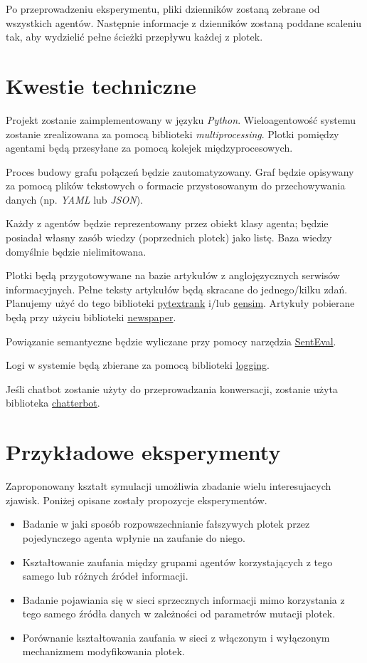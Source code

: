 \documentclass{article}
\begin{document}
	Po przeprowadzeniu eksperymentu, pliki dzienników zostaną zebrane od wszystkich agentów. Następnie informacje z dzienników zostaną poddane scaleniu tak, aby wydzielić pełne ścieżki przepływu każdej z plotek.
	\section{Kwestie techniczne}
	Projekt zostanie zaimplementowany w języku \textit{Python}. Wieloagentowość systemu zostanie zrealizowana za pomocą biblioteki \textit{multiprocessing}. Plotki pomiędzy agentami będą przesyłane za pomocą kolejek międzyprocesowych.
	
	Proces budowy grafu połączeń będzie zautomatyzowany. Graf będzie opisywany za pomocą plików tekstowych o formacie przystosowanym do przechowywania danych (np. \textit{YAML} lub \textit{JSON}).
	
	Każdy z agentów będzie reprezentowany przez obiekt klasy agenta; będzie posiadał własny zasób wiedzy (poprzednich plotek) jako listę. Baza wiedzy domyślnie będzie nielimitowana.
	
	Plotki będą przygotowywane na bazie artykułów z anglojęzycznych serwisów informacyjnych. Pełne teksty artykułów będą skracane do jednego/kilku zdań. Planujemy użyć do tego biblioteki \href{https://github.com/DerwenAI/pytextrank}{pytextrank} i/lub \href{https://pypi.org/project/gensim/}{gensim}. Artykuły pobierane będą przy użyciu biblioteki \href{https://newspaper.readthedocs.io/}{newspaper}.
	
	Powiązanie semantyczne będzie wyliczane przy pomocy narzędzia \href{http://nlpprogress.com/english/semantic_textual_similarity.html}{SentEval}.
	
	Logi w systemie będą zbierane za pomocą biblioteki \href{https://docs.python.org/3/library/logging.html#module-logging}{logging}.
	
	Jeśli chatbot zostanie użyty do przeprowadzania konwersacji, zostanie użyta biblioteka \href{https://chatterbot.readthedocs.io/en/stable/}{chatterbot}.
	
	\section{Przykładowe eksperymenty}
	Zaproponowany kształt symulacji umożliwia zbadanie wielu interesujacych zjawisk. Poniżej opisane zostały propozycje eksperymentów.
	\begin{itemize}
	\item Badanie w jaki sposób rozpowszechnianie fałszywych plotek przez pojedynczego agenta wpłynie na zaufanie do niego.
	\item Kształtowanie zaufania między grupami agentów korzystających z tego samego lub różnych źródeł informacji.
	\item Badanie pojawiania się w sieci sprzecznych informacji mimo korzystania z tego samego źródła danych w zależności od parametrów mutacji plotek.
	\item Porównanie kształtowania zaufania w sieci z włączonym i wyłączonym mechanizmem modyfikowania plotek.
	\end{itemize}
\end{document}
